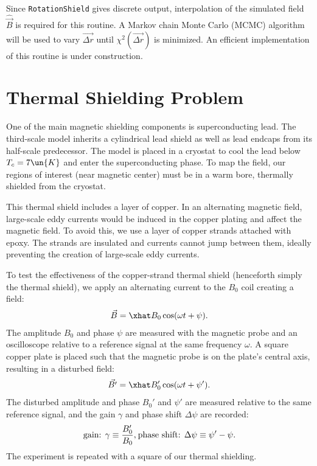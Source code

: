 \documentclass[twocolumn,aps,prb,citeautoscript]{revtex4-1}
\begin{document}
Since \texttt{RotationShield} gives discrete output, interpolation of the simulated field $\hat{\vec B}$
is required for this routine. A Markov chain Monte Carlo (MCMC) algorithm will be used to
vary $\vec{\Delta r}$ until $\chi^2(\vec{\Delta r})$ is minimized. An efficient implementation of this routine
is under construction.

\section{Thermal Shielding Problem}

One of the main magnetic shielding components is superconducting lead. The third-scale
model inherits a cylindrical lead shield as well as lead endcaps from its half-scale predecessor. The model
is placed in a cryostat to cool the lead below $T_c = 7\un{K}$ and enter the superconducting phase.
To map the field, our regions of interest (near magnetic center) must be in a warm bore, thermally shielded
from the cryostat.

This thermal shield includes a layer of copper. In an alternating magnetic field,
large-scale eddy currents would be induced in the copper plating and affect the magnetic field. To avoid this,
we use a layer of copper strands attached with epoxy. The strands are insulated
and currents cannot jump between them, ideally preventing the creation of large-scale eddy currents.

To test the effectiveness of the copper-strand thermal shield (henceforth simply the thermal shield),
we apply an alternating current to the $B_0$ coil creating a field:
\begin{align*}
\vec B = \xhat B_0 \cos(\omega t + \psi).
\end{align*}
The amplitude $B_0$ and phase $\psi$ are measured with the magnetic probe
and an oscilloscope relative to a reference signal at the same frequency $\omega$.
A square copper plate is placed such that the magnetic probe is on the plate's central axis, resulting in a
disturbed field:
\begin{align*}
\vec{B'} = \xhat B_0' \cos(\omega t + \psi').
\end{align*}
The disturbed amplitude and phase $B_0'$ and $\psi'$ are measured relative to the same reference signal,
and the gain $\gamma$ and phase shift $\Delta\psi$ are recorded:
\begin{align*}
\text{gain: }\gamma \equiv {B_0' \over B_0}, \sp{} \text{phase shift: } \Delta\psi \equiv \psi' - \psi.
\end{align*}
The experiment is repeated with a square of our thermal shielding.
\end{document}
